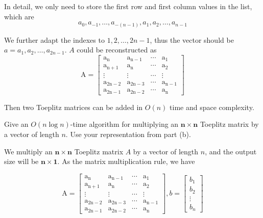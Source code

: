 In detail, we only need to store the first row and first column values in the list, which are $$a_0, a_{-1}, \dots, a_{-(n-1)}, a_1, a_2, \dots, a_{n-1}$$ 

We further adapt the indexes to $1, 2, \dots, 2n-1$, thus the vector should be $a = a_1, a_2, \dots, a_{2n-1}$. $A$ could be reconstructed as $$\mathrm{A}=\left[\begin{array}{cccc}{\mathrm{a}_{\mathrm{n}}} & {\mathrm{a}_{\mathrm{n}-1}} & {\cdots} & {\mathrm{a}_{1}} \\ {\mathrm{a}_{\mathrm{n+1}}} & {\mathrm{a}_{\mathrm{n}}} & {\cdots} & {\mathrm{a}_{2}} \\ {\vdots} & {\vdots} & {\cdots} & {\vdots} \\ {\mathrm{a}_{2\mathrm{n}-2}} & {\mathrm{a}_{2\mathrm{n}-3}} & {\cdots} & {\mathrm{a}_{\mathrm{n}-1}} \\ {\mathrm{a}_{2 \mathrm{n}-1}} & {\mathrm{a}_{2 \mathrm{n}-2}} & {\cdots} & {\mathrm{a}_{\mathrm{n}}}\end{array}\right]$$


Then two Toeplitz matrices can be added in $O(n)$ time and space complexity.




Give an $O(n \log n)$-time algorithm for multiplying an $\boldsymbol{n} \times \boldsymbol{n}$ Toeplitz matrix by a vector of length $n$. Use your representation from part (b).

\solution

We multiply an $\boldsymbol{n} \times \boldsymbol{n}$ Toeplitz matrix $A$ by a vector of length $n$, and the output size will be $\boldsymbol{n} \times \boldsymbol{1}$. As the matrix multiplication rule, we have

$$\mathrm{A}=\left[\begin{array}{cccc}{\mathrm{a}_{\mathrm{n}}} & {\mathrm{a}_{\mathrm{n}-1}} & {\cdots} & {\mathrm{a}_{1}} \\ {\mathrm{a}_{\mathrm{n+1}}} & {\mathrm{a}_{\mathrm{n}}} & {\cdots} & {\mathrm{a}_{2}} \\ {\vdots} & {\vdots} & {\cdots} & {\vdots} \\ {\mathrm{a}_{2\mathrm{n}-2}} & {\mathrm{a}_{2\mathrm{n}-3}} & {\cdots} & {\mathrm{a}_{\mathrm{n}-1}} \\ {\mathrm{a}_{2 \mathrm{n}-1}} & {\mathrm{a}_{2 \mathrm{n}-2}} & {\cdots} & {\mathrm{a}_{\mathrm{n}}}\end{array}\right], b=\begin{bmatrix} b_1\\ b_2 \\ \vdots \\b_{n} \end{bmatrix}$$

